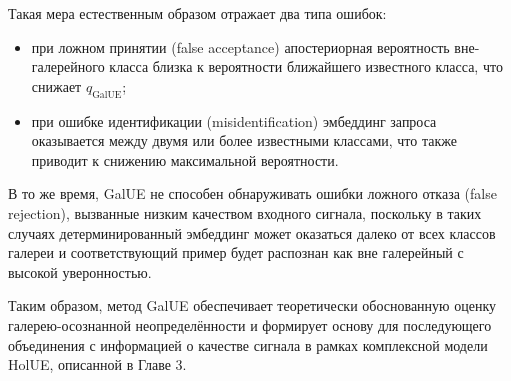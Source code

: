Такая мера естественным образом отражает два типа ошибок:
\begin{itemize}  
    \item при ложном принятии (false acceptance) апостериорная вероятность вне-галерейного класса близка к вероятности ближайшего известного класса, что снижает \(q_{\text{GalUE}}\);  
    \item при ошибке идентификации (misidentification) эмбеддинг запроса оказывается между двумя или более известными классами, что также приводит к снижению максимальной вероятности.
\end{itemize} 
В то же время, GalUE не способен обнаруживать ошибки ложного отказа (false rejection), вызванные низким качеством входного сигнала, поскольку в таких случаях детерминированный эмбеддинг может оказаться далеко от всех классов галереи и соответствующий пример будет распознан как вне галерейный с высокой уверонностью. 

Таким образом, метод GalUE обеспечивает теоретически обоснованную оценку галерею-осознанной неопределённости и формирует основу для последующего объединения с информацией о качестве сигнала в рамках комплексной модели HolUE, описанной в Главе 3.